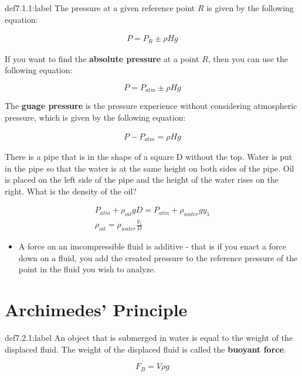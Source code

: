 \begin{definition}{def7.1.1:label}
    The pressure at a given reference point $R$ is given by the following equation:

    \[
    \begin{aligned}
        P = P_R \pm \rho Hg
    \end{aligned}    
    \]

    If you want to find the \textbf{absolute pressure} at a point $R$, then you can use the following equation:

    \[
    P = P_{atm} \pm \rho Hg    
    \]

    The \textbf{guage pressure} is the pressure experience without considering atmospheric pressure, which is given by the following equation:

    \[
    \begin{aligned}
        P - P_{atm} = \rho Hg
    \end{aligned}    
    \]
\end{definition}


\begin{problem}
    There is a pipe that is in the shape of a square D without the top. Water is put in the pipe so that the water is at the same height on both sides of the pipe. Oil is placed on the left side of the pipe and the height of the water rises on the right. What is the density of the oil?

    \[
    \begin{aligned}
        P_{atm} + \rho_{oil}gD = P_{atm} + \rho_{water}gy_1\\
        \rho_{oil} = \rho_{water}\frac{y_1}{D}
    \end{aligned}    
    \]
\end{problem}

\begin{itemize}
    \item A force on an imcompressible fluid is additive - that is if you enact a force down on a fluid, you add the created pressure to the reference pressure of the point in the fluid you wish to analyze.
\end{itemize}


\section{Archimedes' Principle}

\begin{definition}{def7.2.1:label}
    An object that is submerged in water is equal to the weight of the displaced fluid. The weight of the displaced fluid is called the \textbf{buoyant force}.

    \[
    F_B = V\rho g    
    \]
\end{definition}

